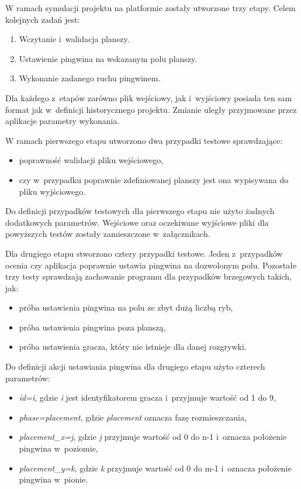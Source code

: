 W ramach symulacji projektu na platformie zostały utworzone trzy etapy.
Celem kolejnych zadań jest:
\begin{enumerate}
    \item Wczytanie i~walidacja planszy.
    \item Ustawienie pingwina na wskazanym polu planszy.
    \item Wykonanie zadanego ruchu pingwinem.
\end{enumerate}

Dla każdego z~etapów zarówno plik wejściowy, jak i~wyjściowy posiada ten sam format jak w~definicji historycznego projektu.
Zmianie uległy przyjmowane przez aplikacje parametry wykonania.


W ramach pierwszego etapu utworzono dwa przypadki testowe sprawdzające:
\begin{itemize}
    \item poprawność walidacji pliku wejściowego,
    \item czy w~przypadku poprawnie zdefiniowanej planszy jest ona wypisywana do pliku wyjściowego.
\end{itemize}
Do definicji przypadków testowych dla pierwszego etapu nie użyto żadnych dodatkowych parametrów.
Wejściowe oraz oczekiwane wyjściowe pliki dla powyższych testów zostały zamieszczone w~załącznikach.


Dla drugiego etapu stworzono cztery przypadki testowe.
Jeden z~przypadków ocenia czy aplikacja poprawnie ustawia pingwina na dozwolonym polu.
Pozostałe trzy testy sprawdzają zachowanie programu dla przypadków brzegowych takich, jak:
\begin{itemize}
    \item próba ustawienia pingwina na polu ze zbyt dużą liczbą ryb,
    \item próba ustawienia pingwina poza planszą,
    \item próba ustawienia gracza, który nie istnieje dla danej rozgrywki.
\end{itemize}

Do definicji akcji ustawiania pingwina dla drugiego etapu użyto czterech parametrów:
\begin{itemize}
    \item \textit{id=i}, gdzie \textit{i} jest identyfikatorem gracza i~przyjmuje wartość od 1 do 9,
    \item \textit{phase=placement}, gdzie \textit{placement} oznacza fazę rozmieszczania,
    \item \textit{placement\_x=j}, gdzie \textit{j} przyjmuje wartość od 0 do n-1 i~oznacza położenie pingwina w~poziomie,
    \item \textit{placement\_y=k}, gdzie \textit{k} przyjmuje wartość od 0 do m-1 i~oznacza położenie pingwina w~pionie.
\end{itemize}

